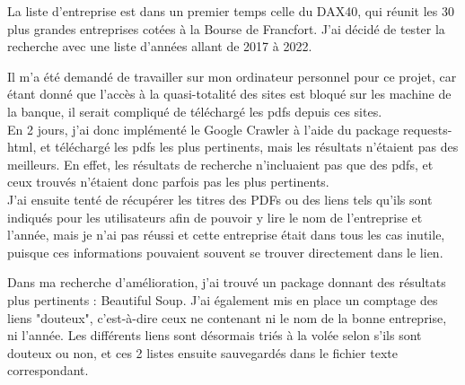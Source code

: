 La liste d'entreprise est dans un premier temps celle du DAX40, qui réunit les 30 plus grandes entreprises cotées à la Bourse de Francfort.
J'ai décidé de tester la recherche avec une liste d'années allant de 2017 à 2022.

Il m'a été demandé de travailler sur mon ordinateur personnel pour ce projet, car étant donné que l'accès à la quasi-totalité des sites est bloqué sur les machine de la banque, il serait compliqué de téléchargé les pdfs depuis ces sites.
\\

En 2 jours, j'ai donc implémenté le Google Crawler à l'aide du package requests-html, et téléchargé les pdfs les plus pertinents, mais les résultats n'étaient pas des meilleurs. 
En effet, les résultats de recherche n'incluaient pas que des pdfs, et ceux trouvés n'étaient donc parfois pas les plus pertinents.
\\

J'ai ensuite tenté de récupérer les titres des PDFs ou des liens tels qu'ils sont indiqués pour les utilisateurs afin de pouvoir y lire le nom de l'entreprise et l'année, mais je n'ai pas réussi et cette entreprise était dans tous les cas inutile, puisque ces informations pouvaient souvent se trouver directement dans le lien.

Dans ma recherche d'amélioration, j'ai trouvé un package donnant des résultats plus pertinents : Beautiful Soup.
J'ai également mis en place un comptage des liens "douteux", c'est-à-dire ceux ne contenant ni le nom de la bonne entreprise, ni l'année.
Les différents liens sont désormais triés à la volée selon s'ils sont douteux ou non, et ces 2 listes ensuite sauvegardés dans le fichier texte correspondant.
\\

